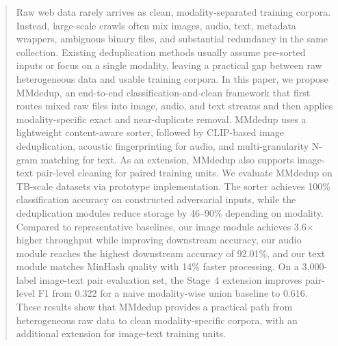\documentclass[conference]{IEEEtran}
\begin{document}
\begin{abstract}
Raw web data rarely arrives as clean, modality-separated training corpora. Instead, large-scale crawls often mix images, audio, text, metadata wrappers, ambiguous binary files, and substantial redundancy in the same collection. Existing deduplication methods usually assume pre-sorted inputs or focus on a single modality, leaving a practical gap between raw heterogeneous data and usable training corpora. In this paper, we propose MMdedup, an end-to-end classification-and-clean framework that first routes mixed raw files into image, audio, and text streams and then applies modality-specific exact and near-duplicate removal. MMdedup uses a lightweight content-aware sorter, followed by CLIP-based image deduplication, acoustic fingerprinting for audio, and multi-granularity N-gram matching for text. As an extension, MMdedup also supports image-text pair-level cleaning for paired training units. We evaluate MMdedup on TB-scale datasets via prototype implementation. The sorter achieves 100\% classification accuracy on constructed adversarial inputs, while the deduplication modules reduce storage by 46--90\% depending on modality. Compared to representative baselines, our image module achieves 3.6$\times$ higher throughput while improving downstream accuracy, our audio module reaches the highest downstream accuracy of 92.01\%, and our text module matches MinHash quality with 14\% faster processing. On a 3,000-label image-text pair evaluation set, the Stage~4 extension improves pair-level F1 from 0.322 for a naive modality-wise union baseline to 0.616. These results show that MMdedup provides a practical path from heterogeneous raw data to clean modality-specific corpora, with an additional extension for image-text training units.





\end{abstract}
\end{document}

